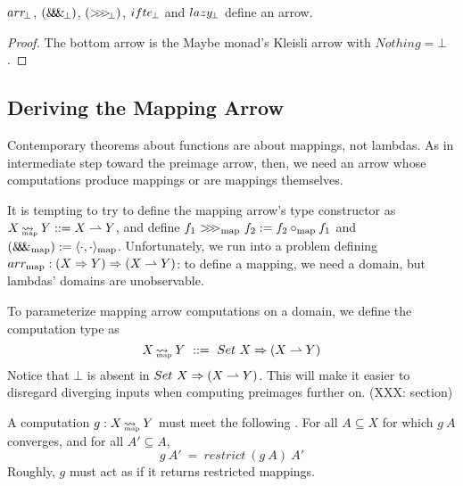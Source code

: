 \documentclass[preprint]{sigplanconf}
\newcommand{\arrow}{\rightsquigarrow}
\newcommand{\pto}{\rightharpoonup}
\newcommand{\arrowarr}{\ensuremath{arr}}
\newcommand{\arrowcomp}{\ensuremath{{>}\mspace{-6mu}{>}\mspace{-6mu}{>}}}
\newcommand{\arrowpair}{\ensuremath{\mathit{\&\mspace{-7.5mu}\&\mspace{-7.5mu}\&}}}
\newcommand{\arrowif}{\ensuremath{ifte}}
\newcommand{\arrowlazy}{\ensuremath{lazy}}
\newcommand{\arrbot}{\arrowarr_{\mspace{-3mu}\bot}}
\newcommand{\compbot}{\arrowcomp_{\mspace{-5mu}\bot}}
\newcommand{\pairbot}{\arrowpair_{\mspace{-3mu}\bot}}
\newcommand{\ifbot}{\arrowif_{\mspace{-2mu}\bot}}
\newcommand{\lazybot}{\arrowlazy_{\mspace{-2mu}\bot}}
\newcommand{\map}{_\mathrm{map}}
\DeclareMathOperator{\mapto}{\arrow_{\mspace{-21mu}\map}}
\newcommand{\arrmap}{\arrowarr\map}
\newcommand{\compmap}{\arrowcomp\map}
\newcommand{\pairmap}{\arrowpair\map}
\begin{document}
\begin{theorem}
$\arrbot$, $(\pairbot)$, $(\compbot)$, $\ifbot$ and $\lazybot$ define an arrow.
\end{theorem}
\begin{proof}
The bottom arrow is the Maybe monad's Kleisli arrow with $Nothing = \bot$.
\end{proof}

\subsection{Deriving the Mapping Arrow}

Contemporary theorems about functions are about mappings, not lambdas.
As in intermediate step toward the preimage arrow, then, we need an arrow whose computations produce mappings or are mappings themselves.

It is tempting to try to define the mapping arrow's type constructor as $X \mapto Y ::= X \pto Y$, and define $f_1~\compmap~f_2 := f_2 \circ\map f_1$ and $(\pairmap) := \pair{\cdot,\cdot}\map$.
Unfortunately, we run into a problem defining $\arrmap : (X \tto Y) \tto (X \pto Y)$: to define a mapping, we need a domain, but lambdas' domains are unobservable.

To parameterize mapping arrow computations on a domain, we define the  computation type as
\begin{equation}
	X \mapto Y \ ::= \ Set~X \tto (X \pto Y)
\end{equation}
Notice that $\bot$ is absent in $Set~X \tto (X \pto Y)$.
This will make it easier to disregard diverging inputs when computing preimages further on. (XXX: section)

A computation $g : X \mapto Y$ must meet the following .
For all $A \subseteq X$ for which $g~A$ converges, and for all $A' \subseteq A$,
\begin{equation}
	g~A' \ = \ restrict~(g~A)~A'
\label{eqn:mapping-arrow-restriction-law}
\end{equation}
Roughly, $g$ must act as if it returns restricted mappings.
\end{document}
